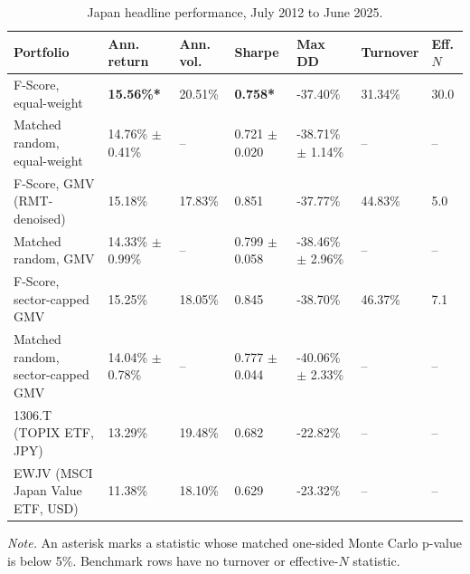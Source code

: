 \documentclass[11pt,a4paper]{report}
\numberwithin{figure}{chapter}
\numberwithin{table}{chapter}
\numberwithin{equation}{chapter}
\begin{document}
\begin{table}[H]
\centering
\scriptsize
\caption{Japan headline performance, July 2012 to June 2025.}
\label{tab:japan_headline}

\setlength{\tabcolsep}{2.5pt}

\begin{tabular}{
@{}
M{0.21\textwidth}
M{0.13\textwidth}
M{0.09\textwidth}
M{0.12\textwidth}
M{0.13\textwidth}
M{0.09\textwidth}
M{0.06\textwidth}
@{}
}
\hline
\textbf{Portfolio} &
\textbf{Ann. return} &
\textbf{Ann. vol.} &
\textbf{Sharpe} &
\textbf{Max DD} &
\textbf{Turnover} &
\textbf{Eff. $N$} \\
\hline

F-Score, equal-weight
& \textbf{15.56\%*}
& 20.51\%
& \textbf{0.758*}
& -37.40\%
& 31.34\%
& 30.0 \\
\hline{}

Matched random, equal-weight
& 14.76\% $\pm$ 0.41\%
& --
& 0.721 $\pm$ 0.020
& -38.71\% $\pm$ 1.14\%
& --
& -- \\
\hline{}

F-Score, GMV (RMT-denoised)
& 15.18\%
& 17.83\%
& 0.851
& -37.77\%
& 44.83\%
& 5.0 \\
\hline{}

Matched random, GMV
& 14.33\% $\pm$ 0.99\%
& --
& 0.799 $\pm$ 0.058
& -38.46\% $\pm$ 2.96\%
& --
& -- \\
\hline{}

F-Score, sector-capped GMV
& 15.25\%
& 18.05\%
& 0.845
& -38.70\%
& 46.37\%
& 7.1 \\
\hline{}

Matched random, sector-capped GMV
& 14.04\% $\pm$ 0.78\%
& --
& 0.777 $\pm$ 0.044
& -40.06\% $\pm$ 2.33\%
& --
& -- \\
\hline{}

1306.T (TOPIX ETF, JPY)
& 13.29\%
& 19.48\%
& 0.682
& -22.82\%
& --
& -- \\
\hline{}

EWJV (MSCI Japan Value ETF, USD)
& 11.38\%
& 18.10\%
& 0.629
& -23.32\%
& --
& -- \\

\hline
\end{tabular}

\vspace{0.05cm}

\begin{minipage}{0.98\textwidth}
\scriptsize
\textit{Note.} An asterisk marks a statistic whose matched one-sided Monte Carlo p-value is below 5\%. Benchmark rows have no turnover or effective-$N$ statistic.
\end{minipage}
\end{table}
\end{document}
